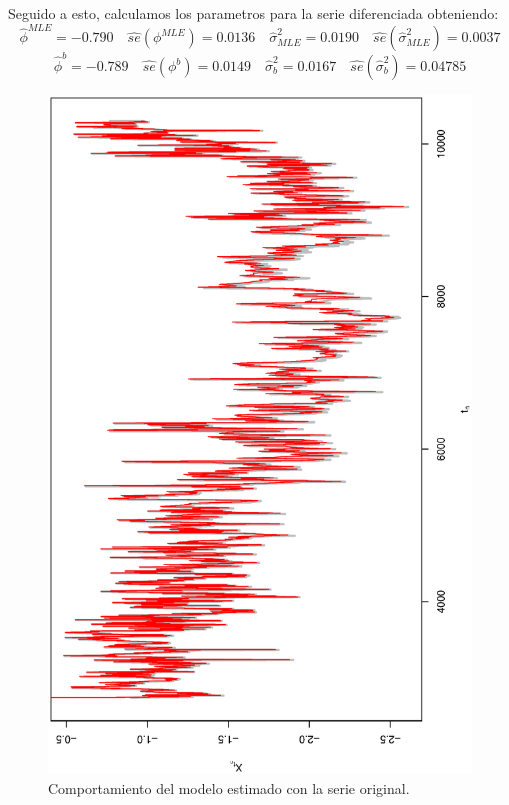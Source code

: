 Seguido a esto, calculamos los parametros para la serie diferenciada obteniendo:
$$\hat{\phi}^{MLE}= -0.790 \quad \hat{se}(\phi^{MLE})=0.0136 \quad \hat{\sigma}^{2}_{MLE}=0.0190 \quad \hat{se}(\hat{\sigma}^{2}_{MLE})=0.0037$$
$$\hat{\phi}^{b}= -0.789 \quad \hat{se}(\phi^{b})=0.0149 \quad \hat{\sigma}^{2}_{b}= 0.0167  \quad \hat{se}(\hat{\sigma}^{2}_{b})=0.04785$$


\begin{figure}[h]
    \begin{minipage}{0.45\textwidth}
    \includegraphics[width=0.8\linewidth,angle = 270]{Kap3/Fig_Cap3/example_data_original_estimation.eps}
    \caption{Comportamiento del modelo estimado con la serie original.}
    \label{fig:example_fit}
    \end{minipage}
    \hfill
    \begin{minipage}{0.45\textwidth}

\end{minipage}
\end{figure}
